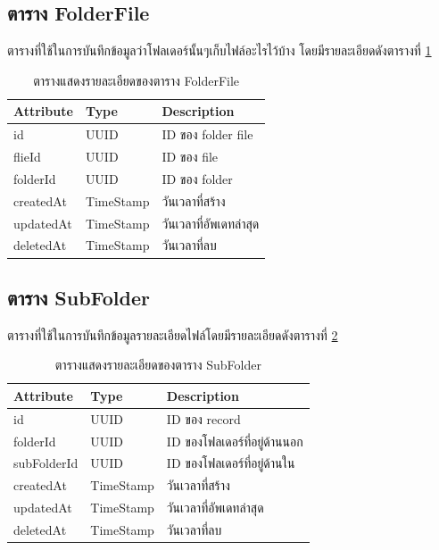 \documentclass[12pt,oneside,openright,a4paper]{cpe-thai-project}
\begin{document}
\subsection{ตาราง FolderFile}
ตารางที่ใช้ในการบันทึกข้อมูลว่าโฟลเดอร์นั้นๆเก็บไฟล์อะไรไว้บ้าง โดยมีรายละเอียดดังตารางที่  \ref{tbl:dbFolderFile}
\begin{table}[!h]
    \centering
    \begin{tabular}{|l|l|l|}
    \hline
    \textbf{Attribute} & \textbf{Type} & \textbf{Description}   \\ \hline
    id        & UUID      & ID ของ folder file     \\ \hline
    flieId    & UUID      & ID ของ file            \\ \hline
    folderId  & UUID      & ID ของ folder          \\ \hline
    createdAt & TimeStamp & วันเวลาที่สร้าง        \\ \hline
    updatedAt & TimeStamp & วันเวลาที่อัพเดทล่าสุด \\ \hline
    deletedAt & TimeStamp & วันเวลาที่ลบ              \\ \hline
    \end{tabular}
    \caption{\centering  ตารางแสดงรายละเอียดของตาราง FolderFile} \label{tbl:dbFolderFile}
\end{table}

\subsection{ตาราง SubFolder}
ตารางที่ใช้ในการบันทึกข้อมูลรายละเอียดไฟล์โดยมีรายละเอียดดังตารางที่ \ref{tbl:dbSubFolder}
\begin{table}[!h]
    \centering
    \begin{tabular}{|l|l|l|}
    \hline
    \textbf{Attribute} & \textbf{Type} & \textbf{Description}   \\ \hline
    id          & UUID      & ID ของ record                \\ \hline
    folderId    & UUID      & ID ของโฟลเดอร์ที่อยู่ด้านนอก \\ \hline
    subFolderId & UUID      & ID ของโฟลเดอร์ที่อยู่ด้านใน  \\ \hline
    createdAt   & TimeStamp & วันเวลาที่สร้าง              \\ \hline
    updatedAt   & TimeStamp & วันเวลาที่อัพเดทล่าสุด       \\ \hline
    deletedAt   & TimeStamp & วันเวลาที่ลบ                \\ \hline  
    \end{tabular}
    \caption{\centering  ตารางแสดงรายละเอียดของตาราง SubFolder} \label{tbl:dbSubFolder}
\end{table}
\end{document}
